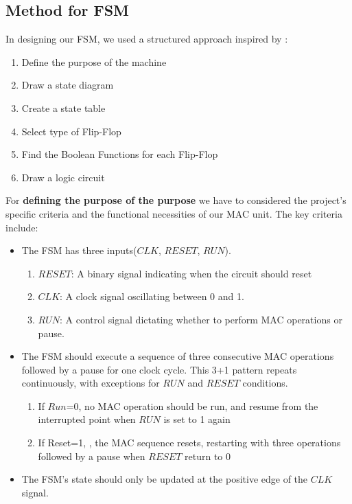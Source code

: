 \subsection{Method for FSM}
In designing our FSM, we used a structured approach inspired by  \cite{allaboutelectronics_2023_sequence}:
\begin{enumerate}
    \item Define the purpose of the machine
    \item Draw a state diagram
    \item Create a state table
    \item Select type of Flip-Flop
    \item Find the Boolean Functions for each Flip-Flop
    \item Draw a logic circuit
\end{enumerate}
For \textbf{defining the purpose of the purpose} we have to considered the project's specific criteria and the functional necessities of our MAC unit. The key criteria include:
\begin{itemize}
    \item The FSM has three inputs($CLK$, $RESET$, $RUN$).
    \begin{enumerate}
        \item $RESET$: A binary signal indicating when the circuit should reset
        \item $CLK$: A clock signal oscillating between 0 and 1.
        \item $RUN$: A control signal dictating whether to perform MAC operations or pause.
    \end{enumerate}
    \item The FSM should execute a sequence of three consecutive MAC operations followed by a pause for one clock cycle. This 3+1 pattern repeats continuously, with exceptions for $RUN$ and $RESET$ conditions.
    \begin{enumerate}
        \item If $Run$=0, no MAC operation should be run, and resume from the interrupted point when 
        $RUN$ is set to 1 again
        \item If Reset=1, , the MAC sequence resets, restarting with three operations followed by a pause when $RESET$ return to 0
    \end{enumerate}
    \item The FSM’s state should only be updated at the positive edge of the $CLK$ signal.
\end{itemize}

